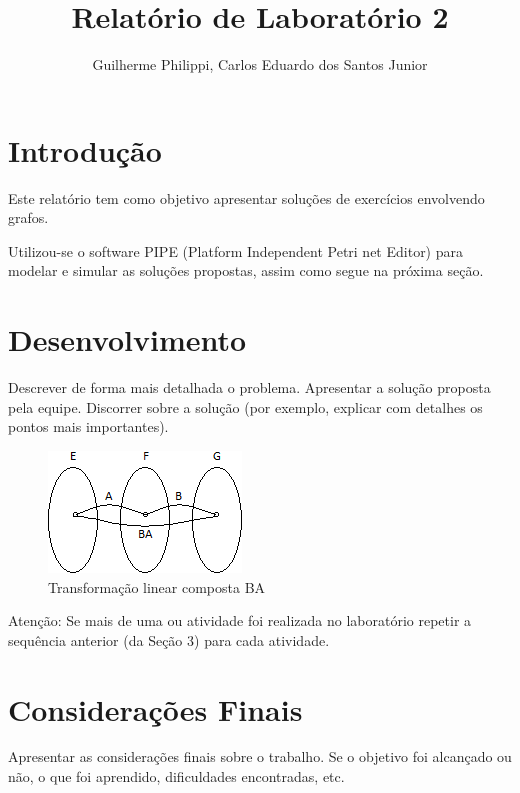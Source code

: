 \documentclass[a4paper,12pt]{article}
\title{Relatório de Laboratório 2}
\author{Guilherme Philippi, Carlos Eduardo dos Santos Junior}
\begin{document}
\maketitle
\tableofcontents

\section{Introdução}

Este relatório tem como objetivo apresentar soluções de exercícios envolvendo grafos.

Utilizou-se o software PIPE (Platform Independent Petri net Editor) \cite{dias2007ferramentas} para modelar e simular as soluções propostas, assim como segue na próxima seção.

\section{Desenvolvimento}
Descrever de forma mais detalhada o problema.
Apresentar a solução proposta pela equipe.
Discorrer sobre a solução (por exemplo, explicar com detalhes os pontos mais
importantes).

\begin{figure}[H]
	\begin{center}
		\includegraphics[width=0.4\linewidth]{compfunc.png}
	\end{center}
	\caption{Transformação linear composta BA}
	\label{fig:compfunc}
\end{figure}

Atenção: Se mais de uma ou atividade foi realizada no laboratório repetir a sequência
anterior (da Seção 3) para cada atividade.

\section{Considerações Finais}
Apresentar as considerações finais sobre o trabalho. Se o objetivo foi alcançado ou não,
o que foi aprendido, dificuldades encontradas, etc.

\newpage
{}
{}



\end{document}
